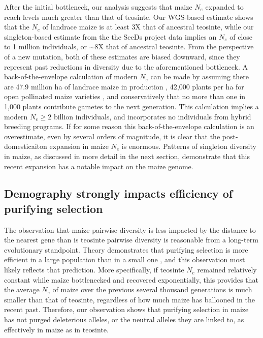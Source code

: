 \documentclass{pnastwo}
\begin{document}
\begin{article}
After the initial bottleneck, our analysis suggests that maize $N_e$ expanded to reach levels much greater than that of teosinte. Our WGS-based estimate shows that the $N_e$ of landrace maize is at least 3X that of ancestral teosinte, while our singleton-based estimate from the the SeeDs project data \cite{somebody} implies an $N_e$ of close to 1 million individuals, or $\sim$8X that of ancestral teosinte. From the perspective of a new mutation, both of these estimates are biased downward, since they represent past reductions in diversity due to the aforementioned bottleneck. A back-of-the-envelope calculation of modern $N_e$ can be made by assuming there are 47.9 million ha of landrace maize in production \cite{cimmyt1999}, 42,000 plants per ha for open pollinated maize varieties \cite{van2010}, and conservatively that no more than one in 1,000 plants contribute gametes to the next generation. This calculation implies a modern $N_e \geq  2$ billion individuals, and incorporates no individuals from hybrid breeding programs. If for some reason this back-of-the-envelope calculation is an overestimate, even by several orders of magnitude, it is clear that the post-domesticaiton expansion in maize $N_e$ is enormous. Patterns of singleton diversity in maize, as discussed in more detail in the next section, demonstrate that this recent expansion has a notable impact on the maize genome.


\subsection{Demography strongly impacts efficiency of purifying selection}
The observation that maize pairwise diversity is less impacted by the distance to the nearest gene than is teosinte pairwise diversity is reasonable from a long-term evolutionary standpoint. Theory demonstrates that purifying selection is more efficient in a large population than in a small one \cite{somebody}, and this observation most likely reflects that prediction. More specifically, if teosinte $N_e$ remained relatively constant while maize bottlenecked and recovered exponentially, this provides that the average $N_e$ of maize over the previous several thousand generations is much smaller than that of teosinte, regardless of how much maize has ballooned in the recent past. Therefore, our observation shows that purifying selection in maize has not purged deleterious alleles, or the neutral alleles they are linked to, as effectively in maize as in teosinte.


\end{article}
\end{document}
